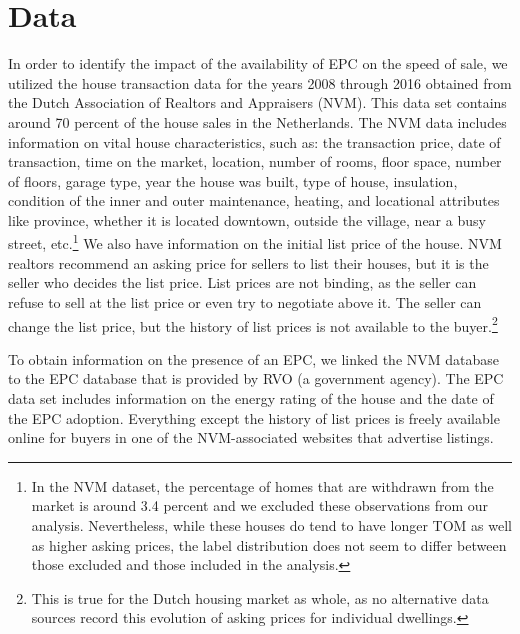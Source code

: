\documentclass[12pt]{article}
\begin{document}
\section{Data}

In order to identify the impact of the availability of EPC on the speed of sale, we utilized the house transaction data for the years 2008 through 2016 obtained from the Dutch Association of Realtors and Appraisers (NVM). This data set contains around 70 percent of the house sales in the Netherlands. The NVM data includes information on vital house characteristics, such as: the transaction price, date of transaction, time on the market, location, number of rooms, floor space, number of floors, garage type, year the house was built, type of house, insulation, condition of the inner and outer maintenance, heating, and locational attributes like province, whether it is located downtown, outside the village, near a busy street, etc.\footnote{In the NVM dataset, the percentage of homes that are withdrawn from the market is around 3.4 percent and we excluded these observations from our analysis. Nevertheless, while these houses do tend to have longer TOM as well as higher asking prices, the label distribution does not seem to differ between those excluded and those included in the analysis.}   We also have information on the initial list price of the house. NVM realtors recommend an asking price for sellers to list their houses, but it is the seller who decides the list price. List prices are not binding, as the seller can refuse to sell at the list price or even try to negotiate above it. The seller can change the list price, but the history of list prices is not available to the buyer.\footnote{This is true for the Dutch housing market as whole, as no alternative data sources record this evolution of asking prices for individual dwellings.} 

To obtain information on the presence of an EPC, we linked the NVM database to the EPC database that is provided by RVO (a government agency). The EPC data set includes information on the energy rating of the house and the date of the EPC adoption. Everything except the history of list prices is freely available online for buyers in one of the NVM-associated websites that advertise listings. 
\end{document}
